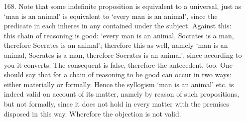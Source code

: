 \begin{itemize}
\item[168.] Note that some indefinite proposition is equivalent to a universal, just as `man is an animal' is equivalent to `every man is an animal', since the predicate in each inheres in any contained under the subject. Against this: this chain of reasoning is good: `every man is an animal, Socrates is a man, therefore Socrates is an animal'; therefore this as well, namely `man is an animal, Socrates is a man, therefore Socrates is an animal', since according to you it converts. The consequent is false, therefore the antecedent, too. One should say that for a chain of reasoning to be good can occur in two ways: either materially or formally. Hence the syllogism `man is an animal' etc. is indeed valid on account of its matter, namely by reason of such propositions, but not formally, since it does not hold in every matter with the premises disposed in this way. Wherefore the objection is not valid.
\end{itemize}
